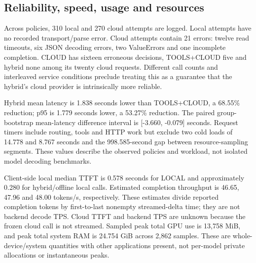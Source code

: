 \documentclass[10pt,a4paper,twocolumn]{article}
\begin{document}
\subsection{Reliability, speed, usage and resources}

Across policies, 310 local and 270 cloud attempts are logged. Local attempts have no recorded transport/parse error. Cloud attempts contain 21 errors: twelve read timeouts, six JSON decoding errors, two ValueErrors and one incomplete completion. CLOUD has sixteen erroneous decisions, TOOLS+CLOUD five and hybrid none among its twenty cloud requests. Different call counts and interleaved service conditions preclude treating this as a guarantee that the hybrid's cloud provider is intrinsically more reliable.

Hybrid mean latency is 1.838 seconds lower than TOOLS+CLOUD, a 68.55\% reduction; p95 is 1.779 seconds lower, a 53.27\% reduction. The paired group-bootstrap mean-latency difference interval is [-3.660, -0.079] seconds. Request timers include routing, tools and HTTP work but exclude two cold loads of 14.778 and 8.767 seconds and the 998.585-second gap between resource-sampling segments. These values describe the observed policies and workload, not isolated model decoding benchmarks.

Client-side local median TTFT is 0.578 seconds for LOCAL and approximately 0.280 for hybrid/offline local calls. Estimated completion throughput is 46.65, 47.96 and 48.00 tokens/s, respectively. These estimates divide reported completion tokens by first-to-last nonempty streamed-delta time; they are not backend decode TPS. Cloud TTFT and backend TPS are unknown because the frozen cloud call is not streamed. Sampled peak total GPU use is 13,758 MiB, and peak total system RAM is 24.754 GiB across 2,862 samples. These are whole-device/system quantities with other applications present, not per-model private allocations or instantaneous peaks.

\begin{table}[t]
\centering\small
\caption{Reported token usage by policy and provider. Missing cloud usage is unknown, not zero.}
\end{table}
\end{document}
